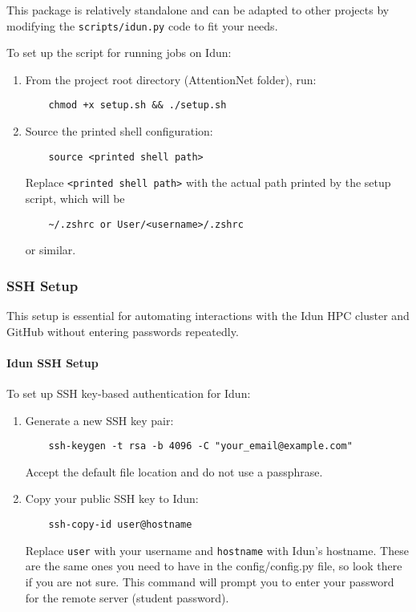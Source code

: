 This package is relatively standalone and can be adapted to other projects by modifying the \texttt{scripts/idun.py} code to fit your needs.

To set up the script for running jobs on Idun:

\begin{enumerate}
    \item From the project root directory (AttentionNet folder), run:
    \begin{verbatim}
    chmod +x setup.sh && ./setup.sh
    \end{verbatim}

    \item Source the printed shell configuration:
    \begin{verbatim}
    source <printed shell path>
    \end{verbatim}
    Replace \texttt{<printed shell path>} with the actual path printed by the setup script, which will be 
    \begin{verbatim}
    ~/.zshrc or User/<username>/.zshrc
    \end{verbatim} or similar.
    
\end{enumerate}

\subsubsection{SSH Setup}

This setup is essential for automating interactions with the Idun HPC cluster and GitHub without entering passwords repeatedly.

\paragraph{Idun SSH Setup}

To set up SSH key-based authentication for Idun:

\begin{enumerate}
    \item Generate a new SSH key pair:
    \begin{verbatim}
    ssh-keygen -t rsa -b 4096 -C "your_email@example.com"
    \end{verbatim}
    Accept the default file location and do not use a passphrase.

    \item Copy your public SSH key to Idun:
    \begin{verbatim}
    ssh-copy-id user@hostname
    \end{verbatim}
    Replace \texttt{user} with your username and \texttt{hostname} with Idun's hostname. These are the same ones you need to have in the config/config.py file, so look there if you are not sure. This command will prompt you to enter your password for the remote server (student password).
\end{enumerate}

